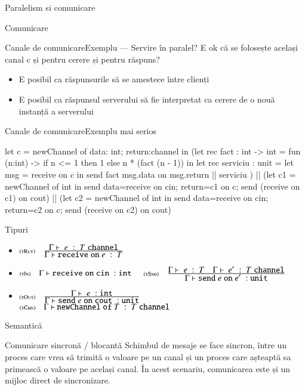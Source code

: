 \documentclass[xcolor=pdftex,romanian,colorlinks]{beamer}
\begin{document}
\begin{section}{Paralelism si comunicare}
\begin{subsection}{Comunicare}
\begin{frame}[fragile]{Canale de comunicare}{Exemplu — Servire în paralel?}
 E ok că se folosește același canal c și pentru cerere și pentru răspuns?
\begin{itemize}
\item<3> E posibil ca răspunsurile să se amestece între clienți
\item<3> E posibil ca răspunsul serverului să fie interpretat ca cerere de o nouă instanță a serverului
\end{itemize}
\end{frame}



\begin{frame}[fragile]{Canale de comunicare}{Exemplu mai serios}
\begin{asciiml}
let c = newChannel of {data: int; return:channel} in
   (let rec fact : int -> int = 
           fun (n:int) -> if n <= 1 then 1 else n * (fact (n - 1)) in
    let rec serviciu : unit = 
       let msg = receive on c in 
          send fact msg.data on msg.return
          ||
          serviciu
   )
   ||
   (let c1 = newChannel of int in
      send {data=receive on cin; return=c1} on c;
      send (receive on c1) on cout)
   ||   
   (let c2 = newChannel of int in
      send {data=receive on cin; return=c2} on c;
      send (receive on c2) on cout)
\end{asciiml}
\end{frame}


\begin{frame}{Tipuri}
\begin{itemize}
\item[] $\reg[tRcv]{\tjud{\Sreceive e}{T}}{\tjud{e}{T\Schannel}}{}$
\item[] \hfill $\reg[tIn]{\tjud{\Sreceive{\Scin}}{\Sint}}{}{}$
\vitem[] $\reg[tSnd]{\tjud{\Ssend e \Son e'}{\Sunit}}{\tjud{e}{T}\si \tjud{e'}{T\Schannel}}{}$
\item[] \hfill $\reg[tOut]{\tjud{\Ssend e \Son{\Scout}}{\Sunit}}{\tjud{e}{\Sint}}{}$
\vitem[] $\reg[tChn]{\tjud{\SnewChannel T}{T\Schannel}}{}{}$
\end{itemize}
\end{frame}

\begin{frame}{Semantică}
\begin{block}{Comunicare sincronă / blocantă}
Schimbul de mesaje se face sincron, între un proces care vrea să trimită o valoare pe un canal și un proces care așteaptă sa primească o valoare pe același canal.  În acest scenariu, comunicarea este și un mijloc direct de sincronizare.


\end{block}
\end{frame}
\end{subsection}
\end{section}
\end{document}
